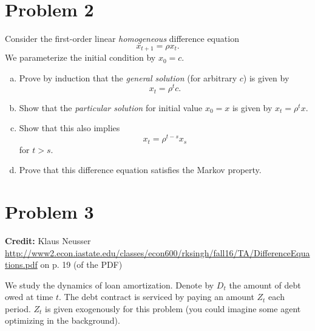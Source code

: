 \documentclass[11pt]{extarticle}
\theoremstyle{plain}
\theoremstyle{definition}
\begin{document}
\vspace{10mm}
\section*{Problem 2}

Consider the first-order linear \textit{homogeneous} difference equation 
\begin{equation*}
	x_{t+1} = \rho x_t.
\end{equation*}
We parameterize the initial condition by $x_0 = c$. 

\begin{enumerate}[(a)]
\item Prove by induction that the \textit{general solution} (for arbitrary $c$) is given by
\begin{equation*}
	x_t = \rho^t c.
\end{equation*}

\item Show that the \textit{particular solution} for initial value $x_0 = x$ is given by $x_t = \rho^t x$. 

\item Show that this also implies 
\begin{equation*}
	x_t = \rho^{t-s} x_s
\end{equation*}
for $t > s$.

\item Prove that this difference equation satisfies the Markov property.

\end{enumerate}



\vspace{10mm}
\section*{Problem 3}

\textbf{Credit:} Klaus Neusser \url{http://www2.econ.iastate.edu/classes/econ600/rksingh/fall16/TA/DifferenceEquations.pdf} on p. 19 (of the PDF)

\vspace{5mm}
\noindent
We study the dynamics of loan amortization. Denote by $D_t$ the amount of debt owed at time $t$. The debt contract is serviced by paying an amount $Z_t$ each period. $Z_t$ is given exogenously for this problem (you could imagine some agent optimizing in the background).
\end{document}

